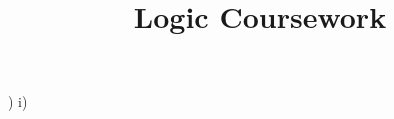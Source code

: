 \documentclass[12pt,a4paper]{report}
\title{Logic Coursework}
\begin{document}
)
   i)
\end{document}
